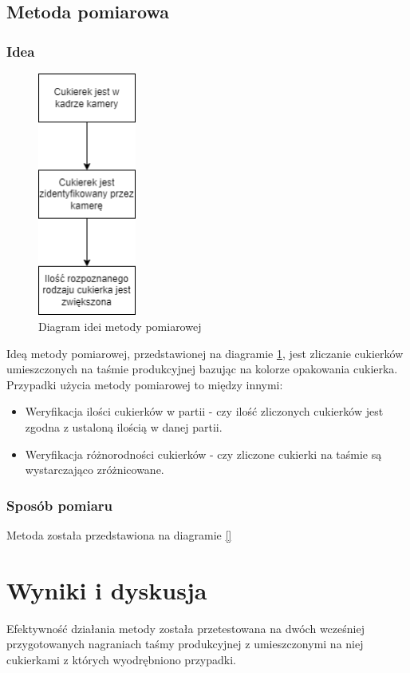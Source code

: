 \documentclass{article}
\begin{document}
\subsection{Metoda pomiarowa}
\label{Metoda pomiarowa}
\subsubsection{Idea}
\label{Idea}

\begin{figure}[H]
    \centering
    \includegraphics[height=8cm]{diagram_idei.png}
    \caption{Diagram idei metody pomiarowej}
    \label{fig:diagramIdei}
\end{figure}

Ideą metody pomiarowej, przedstawionej na diagramie \ref{fig:diagramIdei}, jest zliczanie cukierków umieszczonych na taśmie produkcyjnej bazując na kolorze opakowania cukierka. Przypadki użycia metody pomiarowej to między innymi:

\begin{itemize}
    \item Weryfikacja ilości cukierków w partii - czy ilość zliczonych cukierków jest zgodna z ustaloną ilością w danej partii.
    \item Weryfikacja różnorodności cukierków - czy zliczone cukierki na taśmie są wystarczająco zróżnicowane.
\end{itemize}

\subsubsection{Sposób pomiaru}
\label{Sposób pomiaru}

Metoda została przedstawiona na diagramie \ref{}

\section{Wyniki i dyskusja}
\label{Wyniki i dyskusja}
Efektywność działania metody została przetestowana na dwóch wcześniej przygotowanych nagraniach taśmy produkcyjnej z umieszczonymi na niej cukierkami z których wyodrębniono przypadki.
\end{document}
